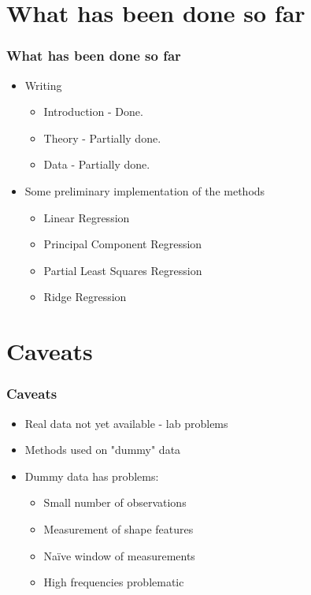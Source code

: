 \documentclass{beamer}
\begin{document}
\section{What has been done so far}
\begin{frame}
	\frametitle{What has been done so far}
	\pause
	\begin{itemize}
		\item Writing
		\pause
		\begin{itemize}
			\item Introduction - Done.
			\pause
			\item Theory - Partially done.
			\pause
			\item Data - Partially done.
			\pause
		\end{itemize}
		\item Some preliminary implementation of the methods
		\pause
		\begin{itemize}
			\item Linear Regression
			\pause
			\item Principal Component Regression
			\pause
			\item Partial Least Squares Regression
			\pause
			\item Ridge Regression
		\end{itemize}
	\end{itemize}
	
\end{frame}


\section{Caveats}
\begin{frame}

	\frametitle{Caveats}
	
	\begin{itemize}
		\item Real data not yet available - lab problems
		\pause
		\item Methods used on "dummy" data
		\pause
		\item Dummy data has problems:
		\pause
		\begin{itemize}
			\item Small number of observations
			\pause
			\item Measurement of shape features
			\pause
			\item Naïve window of measurements
			\pause
			\item High frequencies problematic
			\pause
		\end{itemize}
	\end{itemize}
	
\end{frame}
\end{document}
